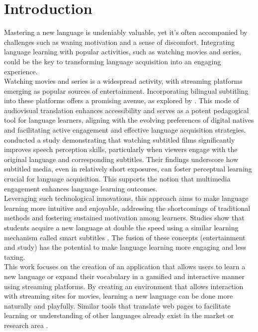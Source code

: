 \documentclass[12pt]{article}
\begin{document}
\section{Introduction}
Mastering a new language is undeniably valuable, yet it's often accompanied by challenges such as waning motivation and a sense of discomfort. Integrating language learning with popular activities, such as watching movies and series, could be the key to transforming language acquisition into an engaging experience. \\
Watching movies and series is a widespread activity, with streaming platforms emerging as popular sources of entertainment. Incorporating bilingual subtitling into these platforms offers a promising avenue, as explored by \cite{Gouleti-Katerina}. This mode of audiovisual translation enhances accessibility and serves as a potent pedagogical tool for language learners, aligning with the evolving preferences of digital natives and facilitating active engagement and effective language acquisition strategies.\\
\cite{Birules-Muntane2016-on} conducted a study demonstrating that watching subtitled films significantly improves speech perception skills, particularly when viewers engage with the original language and corresponding subtitles. Their findings underscore how subtitled media, even in relatively short exposures, can foster perceptual learning crucial for language acquisition. This supports the notion that multimedia engagement enhances language learning outcomes.\\
Leveraging such technological innovations, this approach aims to make language learning more intuitive and enjoyable, addressing the shortcomings of traditional methods and fostering sustained motivation among learners. Studies show that students acquire a new language at double the speed using a similar learning mechanism called smart subtitles \cite{Kovacs13}. The fusion of these concepts (entertainment and study) has the potential to make language learning more engaging and less taxing. \\
This work focuses on the creation of an application that allows users to learn a new language or expand their vocabulary in a gamified and interactive manner using streaming platforms. By creating an environment that allows interaction with streaming sites for movies, learning a new language can be done more naturally and playfully. Similar tools that translate web pages to facilitate learning or understanding of other languages already exist in the market or research area \cite{ElBatanony21}.\\
\end{document}
